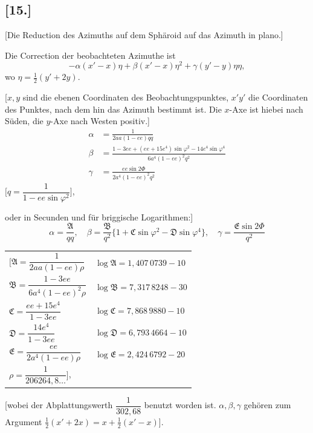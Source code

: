 \documentclass[12pt,a4paper]{article}
\begin{document}
\newpage
\subsection*{[15.]}
\begin{center}
[Die Reduction des Azimuths auf dem Sphäroid auf das Azimuth in plano.]
\end{center}

Die Correction der beobachteten Azimuthe ist
\[
-\alpha(x'-x)\eta + \beta(x'-x)\eta^2 + \gamma(y'-y)\eta\eta,
\]
wo $\eta = \tfrac{1}{2}(y'+2y)$.

[$x,y$ sind die ebenen Coordinaten des Beobachtungspunktes, $x'y'$ die Coordinaten des Punktes, nach dem hin das Azimuth bestimmt ist. Die $x$-Axe ist hiebei nach Süden, die $y$-Axe nach Westen positiv.]
\begin{align*}
\alpha &= \frac{1}{2aa(1-ee)qq}\\
\beta &= \frac{1-3ee+(ee+15e^4)\sin\varphi^2-14e^4\sin\varphi^4}{6a^4(1-ee)^2q^2}\\
\gamma &= \frac{ee\sin2\Phi}{2a^4(1-ee)^2q^2}
\end{align*}
$\bigl[q = \dfrac{1}{1-ee\sin\varphi^2}\bigr]$,

oder in Secunden und für briggische Logarithmen:]
\[
\alpha = \frac{\mathfrak{A}}{qq},\quad \beta = \frac{\mathfrak{B}}{q^2}\{1+\mathfrak{C}\sin\varphi^2-\mathfrak{D}\sin\varphi^4\},\quad \gamma = \frac{\mathfrak{E}\sin2\Phi}{q^2}
\]
\begin{center}
\begin{tabular}{ll}
$\bigl[\mathfrak{A} = \dfrac{1}{2aa(1-ee)\rho}$ & $\log\mathfrak{A} = 1{,}407\,0739-10$\\[4pt]
$\mathfrak{B} = \dfrac{1-3ee}{6a^4(1-ee)^2\rho}$ & $\log\mathfrak{B} = 7{,}317\,8248-30$\\[4pt]
$\mathfrak{C} = \dfrac{ee+15e^4}{1-3ee}$ & $\log\mathfrak{C} = 7{,}868\,9880-10$\\[4pt]
$\mathfrak{D} = \dfrac{14e^4}{1-3ee}$ & $\log\mathfrak{D} = 6{,}793\,4664-10$\\[4pt]
$\mathfrak{E} = \dfrac{ee}{2a^4(1-ee)\rho}$ & $\log\mathfrak{E} = 2{,}424\,6792-20$\\[4pt]
$\rho = \dfrac{1}{206264{,}8\ldots}\bigr]$,
\end{tabular}
\end{center}

[wobei der Abplattungswerth $\dfrac{1}{302{,}68}$ benutzt worden ist. $\alpha,\beta,\gamma$ gehören zum Argument $\tfrac{1}{2}(x'+2x) = x + \tfrac{1}{2}(x'-x)$].
\end{document}
